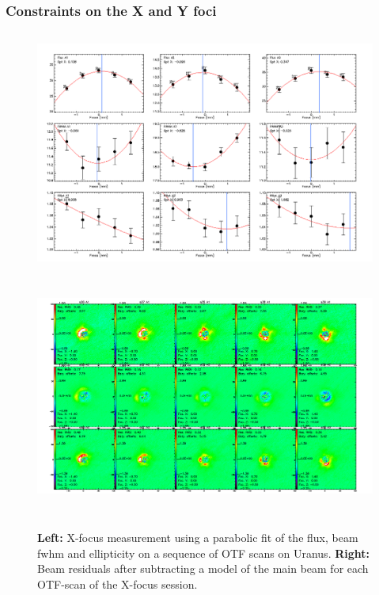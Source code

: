 \subsubsection{Constraints on the X and Y foci}
\label{sec:focus_X_Y}

\begin{figure}[h!]
\centering
\includegraphics[height=8cm]{Figures/plot_20170223s39.png}
\hspace{0.5cm}
\includegraphics[height=8cm]{Figures/residuals_focus_otf_20170223s39.png}
\caption{{\footnotesize \textbf{Left:} X-focus measurement using a parabolic fit of the flux, beam fwhm and ellipticity on a sequence of OTF scans on Uranus. \textbf{Right:} Beam residuals after subtracting a model of the main beam for each OTF-scan of the X-focus session.}}
\label{fig:X_focus}
\end{figure}

